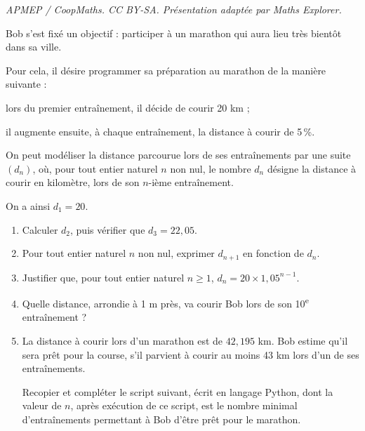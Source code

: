 \documentclass[10pt]{article}
\providecommand{\ieme}{\textsuperscript{e}}
\begin{document}
\noindent\textit{APMEP / CoopMaths. CC BY-SA. Présentation adaptée par Maths Explorer.}\par\medskip
\bigskip

Bob s'est fixé un objectif : participer à un marathon qui aura lieu très bientôt dans sa ville.

Pour cela, il désire programmer sa préparation au marathon de la manière suivante :

\begin{list}{\textbullet}{}
\item lors du premier entraînement, il décide de courir 20 km ;
\item il augmente ensuite, à chaque entraînement, la distance à courir de 5\,\%.
\end{list}

On peut modéliser la distance parcourue lors de ses entraînements par une suite $(d_n)$, où, pour tout entier naturel $n$ non nul, le nombre $d_n$ désigne la distance à courir en kilomètre, lors de son $n$-ième entraînement.

On a ainsi $d_1 = 20$.

\begin{enumerate}
\item Calculer $d_2$, puis vérifier que $d_3=22,05$.
\item Pour tout entier naturel $n$ non nul, exprimer $d_{n+1}$ en fonction de $d_n$.
\item Justifier que, pour tout entier naturel $n \geqslant 1$, $d_n= 20\times 1,05^{n-1}$.
\item Quelle distance, arrondie à 1 m près, va courir Bob lors de son 10\ieme{} entraînement ?
\item La distance à courir lors d'un marathon est de $42,195$ km. Bob estime qu'il sera prêt pour la
course, s'il parvient à courir au moins 43 km lors d'un de ses entraînements.

Recopier et compléter le script suivant, écrit en langage Python, dont la valeur de $n$, après exécution de ce script, est le nombre minimal d'entraînements permettant à Bob d'être prêt pour le marathon.


\begin{center}
\end{center}

\end{enumerate}
\end{document}
